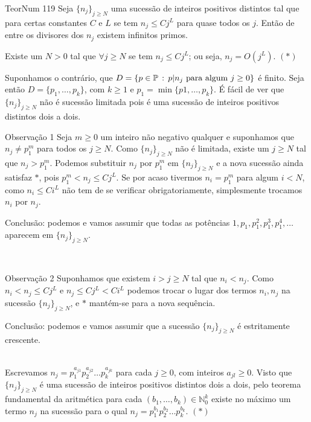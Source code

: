 \documentclass[repertorio-solutions-1.tex]{subfiles}
\newcommand*{\nj}{\ensuremath{\{n_j\}_{j\geq N}}}
\renewcommand*{\=}[1]{\ensuremath{\stackrel{\text{#1}}{=}}}
\begin{document}
\begin{problem}{TeorNum 119}
Seja $\nj$ uma sucessão de inteiros positivos distintos tal que
para certas constantes $C$ e $L$ se tem $n_j\leq Cj^L$ para quase todos os $j$.
Então de entre os divisores dos $n_j$ existem infinitos primos.
\end{problem}

\begin{solution}
Existe um $N>0$ tal que $\forall j\geq N$ se tem $n_j\leq Cj^L$; ou seja,
$n_j=O(j^L)$. $(*)$

Suponhamos o contrário, que
$D=\{p\in\mathbb{P}\,:\, p|n_j\text{ para algum }j\geq 0\}$ é finito.
Seja então $D=\{p_1,\dots,p_k\}$, com $k\geq 1$ e $p_1=\min\{p1,\dots,p_k\}$.
É fácil de ver que $\nj$ não é sucessão limitada pois é uma
sucessão de inteiros positivos distintos dois a dois.
\\

\begin{observation}{Observação 1}
Seja $m\geq 0$ um inteiro não negativo qualquer e suponhamos que $n_j\neq p_1^m$
para todos os $j\geq N$.
Como $\nj$ não é limitada, existe um $j\geq N$ tal que $n_j>p_1^m$.
Podemos substituir $n_j$ por $p_1^m$ em $\nj$ e a nova sucessão ainda satisfaz
$*$, pois $p_1^m<n_j\leq Cj^L$.
Se por acaso tivermos $n_i=p_1^m$ para algum $i<N$, como $n_i\leq Ci^L$
não tem de se verificar obrigatoriamente, simplesmente trocamos $n_i$ por $n_j$.

Conclusão: podemos e vamos assumir que todas as potências
$1,p_1,p_1^2,p_1^3,p_1^4,\dots$ aparecem em $\nj$.
\end{observation}
\\

\begin{observation}{Observação 2}
Suponhamos que existem $i>j\geq N$ tal que $n_i<n_j$.
Como $n_i<n_j\leq Cj^L$ e $n_j\leq Cj^L<Ci^L$ podemos trocar o lugar dos termos
$n_i, n_j$ na sucessão $\nj$, e $*$ mantém-se para a nova sequência.

Conclusão: podemos e vamos assumir que a sucessão $\nj$ é estritamente crescente.
\end{observation}
\\

Escrevamos $n_j=p_1^{a_{j1}}p_2^{a_{j2}}\dots p_k^{a_{jk}}$ para cada $j\geq 0$,
com inteiros $a_{jl}\geq 0$.
Visto que $\nj$ é uma sucessão de inteiros positivos distintos dois a dois,
pelo teorema fundamental da aritmética para cada
$(b_1,\dots,b_k)\in\mathbb{N}_0^k$ existe no máximo um termo $n_j$ na sucessão
para o qual $n_j=p_1^{b_1}p_2^{b_2}\dots p_k^{b_k}$. $(*)$


\end{solution}
\end{document}

